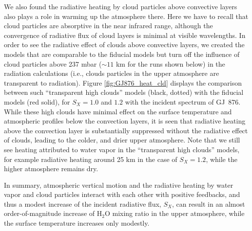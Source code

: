\documentclass[11pt,numberedappendix,twocolappendix,]{emulateapj}
\def\water{H$_2$O }
\begin{document}
We also found the radiative heating by cloud particles above convective layers also plays a role in warming up the atmosphere there. 
Here we have to recall that cloud particles are absorptive in the near infrared range, although the convergence of radiative flux of cloud layers is minimal at visible wavelengths.  
In order to see the radiative effect of clouds above convective layers, we created the models that are comparable to the fiducial models but turn off the influence of cloud particles above 237 mbar ($\sim 11$ km for the runs shown below) in the radiation calculations (i.e., clouds particles in the upper atmosphere are transparent to radiation). 
Figure \ref{fig:GJ876_heat_cld} displays the comparison between such ``transparent high clouds'' models (black, dotted) with the fiducial models (red solid), for $S_X=1.0$ and $1.2$ with the incident spectrum of GJ~876. 
While these high clouds have minimal effect on the surface temperature and atmospheric profiles below the convection layers, it is seen that radiative heating above the convection layer is substantially suppressed without the radiative effect of clouds, leading to the colder, and drier upper atmosphere. 
Note that we still see heating attributed to water vapor in the ``transparent high clouds'' models, for example radiative heating around 25 km in the case of $S_X=1.2$, while the higher atmosphere remains dry. 

In summary, atmospheric vertical motion and the radiative heating by water vapor and cloud particles interact with each other with positive feedbacks, and thus a modest increase of the incident radiative flux, $S_X$, can result in an almost order-of-magnitude increase of \water mixing ratio in the upper atmosphere, while the surface temperature increases only modestly. 

\end{document}
